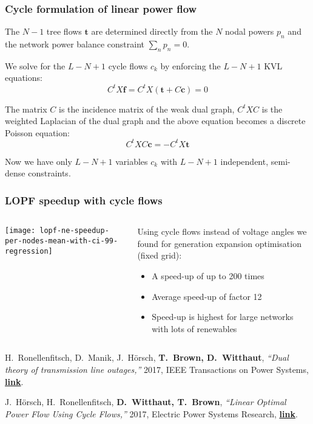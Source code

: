 \documentclass[10pt,aspectratio=169,dvipsnames]{beamer}
\let\olditem\item
\renewcommand{\item}{%
\olditem\vspace{5pt}}
\begin{document}
\begin{frame}
  \frametitle{Cycle formulation of linear power flow}

  The $N-1$ tree flows $\mathbf{t}$ are determined directly from the
  $N$ nodal powers $p_n$ and the network power balance constraint
  $\sum_n p_n = 0$.

  We solve for the $L-N+1$ cycle flows $c_k$ by enforcing  the $L-N+1$ KVL equations:
  \begin{equation*}
    C^t X \mathbf{f} = C^t X (\mathbf{t} + C \mathbf{c}) = 0
  \end{equation*}

  The matrix $C$ is the incidence matrix of the \alert{weak dual
    graph}, $C^t X C$ is the weighted Laplacian of the dual graph and
  the above equation becomes a discrete Poisson equation:
  \begin{equation*}
    C^t X C \mathbf{c} =  - C^t X \mathbf{t}
  \end{equation*}

  Now we have only $L-N+1$ variables $c_k$ with $L-N+1$ independent, \alert{semi-dense} constraints.
\end{frame}



\begin{frame}
  \frametitle{LOPF speedup with cycle flows}
\begin{columns}[T]
  \begin{column}{7cm}
  \texttt{[image: lopf-ne-speedup-per-nodes-mean-with-ci-99-regression]}
  \end{column}
  \begin{column}{6cm}
    \vspace{0.5cm}
    Using \alert{cycle flows instead of voltage angles} we found for generation expansion optimisation (fixed grid):
    \begin{itemize}
    \item A speed-up of up to \alert{200 times}
    \item Average speed-up of \alert{factor 12}
    \item Speed-up is highest for \alert{large networks with lots of renewables}
    \end{itemize}
  \end{column}

\end{columns}

\vspace{.3cm}

  \footnotesize
H.~Ronellenfitsch, D.~Manik, J.~Hörsch, {\bf T.~Brown, D.~Witthaut}, \emph{``Dual theory of transmission line outages,''} 2017, IEEE Transactions on Power Systems, \href{https://arxiv.org/abs/1606.07276}{\bf\color{blue}\underline{link}}.

J.~Hörsch, H.~Ronellenfitsch, {\bf D.~Witthaut, T.~Brown}, \emph{``Linear Optimal Power Flow Using Cycle Flows,''} 2017, Electric Power Systems Research,
\href{https://arxiv.org/abs/1704.01881}{\bf\color{blue}\underline{link}}.
\end{frame}
\end{document}
